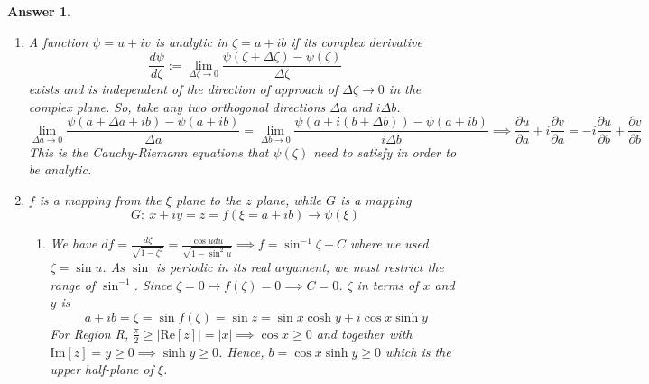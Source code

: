 \documentclass[a4paper]{article}
\newtheorem{ans}{Answer}[section]
\theoremstyle{new}
\begin{document}
\begin{ans}\leavevmode
\begin{enumerate}[label=(\alph*)]
\item A function $\psi=u+iv$ is analytic in $\zeta=a+ib$ if its complex derivative
$$\frac{d\psi}{d\zeta}:=\lim_{\Delta \zeta\rightarrow0}\frac{\psi(\zeta+\Delta\zeta)-\psi(\zeta)}{\Delta\zeta}$$
exists and is independent of the direction of approach of $\Delta\zeta\rightarrow0$ in the complex plane. So, take any two orthogonal directions $\Delta a$ and $i\Delta b$.
$$\lim_{\Delta a\rightarrow0}\frac{\psi(a+\Delta a+ib)-\psi(a+ib)}{\Delta a}=\lim_{\Delta b\rightarrow0}\frac{\psi(a+i(b+\Delta b))-\psi(a+ib)}{i\Delta b}\implies\frac{\partial u}{\partial a}+i\frac{\partial v}{\partial a}=-i\frac{\partial u}{\partial b}+\frac{\partial v}{\partial b}$$
This is the Cauchy-Riemann equations that $\psi(\zeta)$ need to satisfy in order to be analytic.
\item $f$ is a mapping from the $\xi$ plane to the $z$ plane, while $G$ is a mapping  
$$G:~x+iy=z=f(\xi=a+ib)\rightarrow\psi(\xi)$$
\begin{enumerate}[label=(\roman*)]
\item 
We have $df=\frac{d\zeta}{\sqrt{1-\zeta^2}}=\frac{\cos u du}{\sqrt{1-\sin^2u}}\implies f=\sin^{-1}\zeta+C$ where we used $\zeta=\sin u$. As $\sin$ is periodic in its real argument, we must restrict the range of $\sin^{-1}$. Since $\zeta=0\mapsto f(\zeta)=0\implies C=0$. $\zeta$ in terms of $x$ and $y$ is
$$a+ib=\zeta=\sin f(\zeta)=\sin z=\sin x\cosh y+i\cos x\sinh y$$
For Region R, $\frac{\pi}{2}\geq|\text{Re}[z]|=|x|\implies\cos x\geq0$ and together with $\text{Im}[z]=y\geq0\implies\sinh y\geq0$. Hence, $b=\cos x\sinh y\geq0$ which is the upper half-plane of $\xi$.
      \begin{center}
\end{center}
\end{enumerate}
\end{enumerate}
\end{ans}
\end{document}
